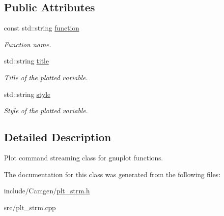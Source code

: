 \subsection*{Public Attributes}
\begin{DoxyCompactItemize}
\item 
\hypertarget{a00231_a3e82c7a76b1bdd820222abd5996c3f13}{const std\-::string \hyperlink{a00231_a3e82c7a76b1bdd820222abd5996c3f13}{function}}\label{a00231_a3e82c7a76b1bdd820222abd5996c3f13}

\begin{DoxyCompactList}\small\item\em Function name. \end{DoxyCompactList}\item 
\hypertarget{a00231_ae92cbfd7ee917d5737abc3f5fae2384b}{std\-::string \hyperlink{a00231_ae92cbfd7ee917d5737abc3f5fae2384b}{title}}\label{a00231_ae92cbfd7ee917d5737abc3f5fae2384b}

\begin{DoxyCompactList}\small\item\em Title of the plotted variable. \end{DoxyCompactList}\item 
\hypertarget{a00231_af4af167b5b94933151562b3bacef443a}{std\-::string \hyperlink{a00231_af4af167b5b94933151562b3bacef443a}{style}}\label{a00231_af4af167b5b94933151562b3bacef443a}

\begin{DoxyCompactList}\small\item\em Style of the plotted variable. \end{DoxyCompactList}\end{DoxyCompactItemize}


\subsection{Detailed Description}
Plot command streaming class for gnuplot functions. 

The documentation for this class was generated from the following files\-:\begin{DoxyCompactItemize}
\item 
include/\-Camgen/\hyperlink{a00700}{plt\-\_\-strm.\-h}\item 
src/plt\-\_\-strm.\-cpp\end{DoxyCompactItemize}
